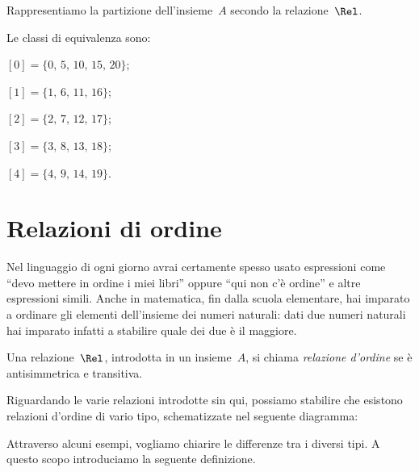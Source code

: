 \begin{exrig}
\begin{esempio}
Rappresentiamo la partizione dell'insieme~$A$ secondo la relazione~$\Rel$.
\begin{center}
 
\end{center}
Le classi di equivalenza sono:
\begin{itemize*}
\item $ [0]=\{0\text{, }5\text{, }10\text{, }15\text{, }20\} $;
\item $ [1]=\{1\text{, }6\text{, }11\text{, }16\} $;
\item $ [2]=\{2\text{, }7\text{, }12\text{, }17\} $;
\item $ [3]=\{3\text{, }8\text{, }13\text{, }18\} $;
\item $ [4]=\{4\text{, }9\text{, }14\text{, }19\} $.
\end{itemize*}
 \end{esempio}
\end{exrig}

\ovalbox{\risolvii \ref{ese:7.27}, \ref{ese:7.28}, \ref{ese:7.29}, \ref{ese:7.30}, \ref{ese:7.31}\ref{ese:7.32}, \ref{ese:7.33}, \ref{ese:7.34}, \ref{ese:7.35}, \ref{ese:7.36}, \ref{ese:7.37}}

\section{Relazioni di ordine}

Nel linguaggio di ogni giorno avrai certamente spesso usato espressioni come ``devo mettere in ordine i miei
libri'' oppure ``qui non c'è ordine'' e altre espressioni simili.
Anche in matematica, fin dalla scuola elementare, hai imparato a ordinare gli elementi dell'insieme dei
numeri naturali: dati due numeri naturali hai imparato infatti a stabilire quale dei due è il maggiore.

\begin{definizione}
Una relazione~$\Rel$, introdotta in un insieme~$A$, si chiama \emph{relazione d'ordine} se è antisimmetrica e transitiva.
\end{definizione}

Riguardando le varie relazioni introdotte sin qui, possiamo stabilire che esistono relazioni d'ordine di vario tipo, schematizzate nel seguente diagramma:
\begin{center}
 
\end{center}

Attraverso alcuni esempi, vogliamo chiarire le differenze tra i diversi tipi. A questo scopo introduciamo la seguente definizione.

